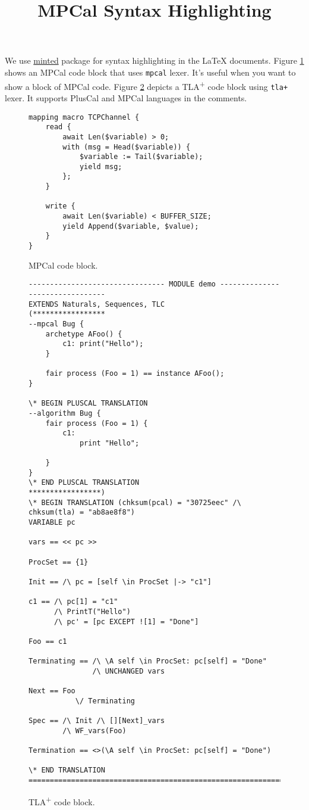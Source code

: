 \documentclass[12pt]{article}
\begin{document}
\title{MPCal Syntax Highlighting}
\date{}

\maketitle

We use \href{https://ctan.org/pkg/minted?lang=en}{\textsf{minted}} package for syntax highlighting in the \LaTeX\xspace documents. Figure \ref{fig-mpcal} shows an MPCal code block that uses \texttt{mpcal} lexer. It's useful when you want to show a block of MPCal code. Figure \ref{fig-tlaplus} depicts a TLA\textsuperscript{+} code block using \texttt{tla+} lexer. It supports PlusCal and MPCal languages in the comments.

\begin{figure}[H]
	\begin{verbatim}
mapping macro TCPChannel {
    read {
        await Len($variable) > 0; 
        with (msg = Head($variable)) {
            $variable := Tail($variable);
            yield msg;
        };
    }

    write {
        await Len($variable) < BUFFER_SIZE;
        yield Append($variable, $value);
    }
}
	\end{verbatim}
  	\caption{MPCal code block.}
  	\label{fig-mpcal}
\end{figure}

\begin{figure}[H]
	\begin{verbatim}
-------------------------------- MODULE demo --------------------------------
EXTENDS Naturals, Sequences, TLC
(*****************
--mpcal Bug {
    archetype AFoo() {
        c1: print("Hello");
    }

    fair process (Foo = 1) == instance AFoo();
}

\* BEGIN PLUSCAL TRANSLATION
--algorithm Bug {
    fair process (Foo = 1) {
        c1:
            print "Hello";
    
    }
}
\* END PLUSCAL TRANSLATION
*****************)
\* BEGIN TRANSLATION (chksum(pcal) = "30725eec" /\ chksum(tla) = "ab8ae8f8")
VARIABLE pc

vars == << pc >>

ProcSet == {1}

Init == /\ pc = [self \in ProcSet |-> "c1"]

c1 == /\ pc[1] = "c1"
      /\ PrintT("Hello")
      /\ pc' = [pc EXCEPT ![1] = "Done"]

Foo == c1

Terminating == /\ \A self \in ProcSet: pc[self] = "Done"
               /\ UNCHANGED vars

Next == Foo
           \/ Terminating

Spec == /\ Init /\ [][Next]_vars
        /\ WF_vars(Foo)

Termination == <>(\A self \in ProcSet: pc[self] = "Done")

\* END TRANSLATION 
=============================================================================
	\end{verbatim}
  	\caption{TLA\textsuperscript{+} code block.}
  	\label{fig-tlaplus}
\end{figure}
\end{document}
